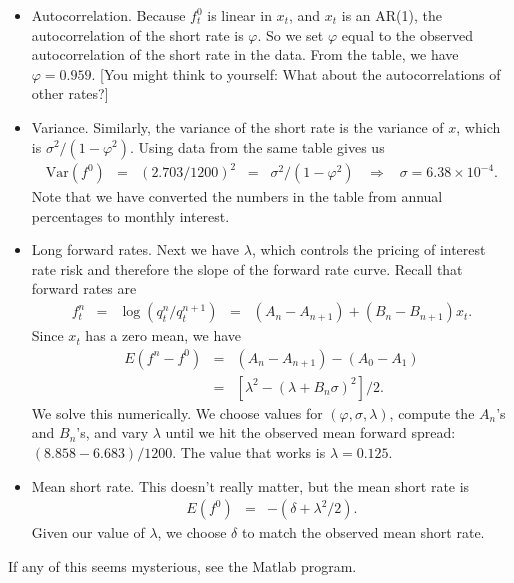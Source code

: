 \documentclass[11pt]{article}
\begin{document}
\begin{itemize}
\item Autocorrelation.  Because $f^0_t$ is linear in $x_t$, and $x_t$ is an AR(1),
the autocorrelation of the short rate is $\varphi$.
So we set $\varphi$ equal to the observed autocorrelation of the short rate in the data.
From the table, we have $\varphi = 0.959$.
[You might think to yourself:  What about the autocorrelations of other rates?]

\item Variance.  Similarly, the variance of the short rate is the variance of $x$,
which is $ \sigma^2/(1-\varphi^2)$.
Using data from the same table gives us
\begin{eqnarray*}
    \mbox{Var}(f^0) &=& \left( 2.703/1200 \right)^2
            \;\;=\;\; \sigma^2/(1-\varphi^2)
            \;\;\;\Rightarrow\;\;\; \sigma = 6.38 \times 10^{-4} .
\end{eqnarray*}
Note that we have converted the numbers in the table from annual percentages
to monthly interest.

\item Long forward rates.  Next we have $\lambda$, which controls the pricing of
interest rate risk and therefore the slope of the forward rate curve.
Recall that forward rates are
\begin{eqnarray*}
    f^n_t &=& \log (q^n_t/q^{n+1}_t)
                \;\;=\;\;  (A_n - A_{n+1}) + (B_n - B_{n+1}) x_t .
\end{eqnarray*}
Since $x_t$ has a zero mean,  we have
\begin{eqnarray*}
    E (f^n - f^0) &=&  (A_n - A_{n+1}) - (A_0 - A_{1}) \\
            &=&  \left[ \lambda^2 - (\lambda + B_n\sigma)^2 \right] / 2 .
\end{eqnarray*}
We solve this numerically.
We choose values for $(\varphi, \sigma, \lambda)$,
compute the $A_n$'s and $B_n$'s, and vary $\lambda$ until
we hit the observed mean forward spread:
$(8.858-6.683)/1200$.
The value that works is $\lambda = 0.125$.

\item Mean short rate.  This doesn't really matter, but
the mean short rate is
\begin{eqnarray*}
    E (f^0) &=&  - (\delta + \lambda^2/2) .
\end{eqnarray*}
Given our value of $\lambda$, we choose $\delta$ to match
the observed mean short rate.

\end{itemize}
If any of this seems mysterious, see the Matlab program.
\end{document}
